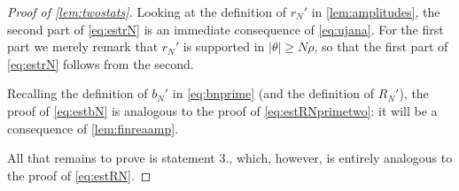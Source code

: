 \documentclass[
	fontsize=11pt, 
	twoside=false, 
	abstract=true, 
	a4paper,
]{scrartcl}
\newcommand{\dd}{\mathrm{d}}
\newcommand{\abs}[1]{\left\lvert#1\right\rvert}
\begin{document}
\begin{proof}[Proof of \cref{lem:twostats}]
		Looking at the definition of $r_N'$ in \cref{lem:amplitudes}, the second part of \cref{eq:estrN} is an immediate consequence of \cref{eq:ujana}. For the first part we merely remark that $r_N'$ is supported in $\abs{\theta} \geq N\rho$, so that the first part of \cref{eq:estrN} follows from the second.
		
		Recalling the definition of $b_N'$ in \cref{eq:bnprime} (and the definition of $R_N'$), the proof of \cref{eq:estbN} is analogous to the proof of \cref{eq:estRNprimetwo}: it will be a consequence of \cref{lem:finreaamp}.

		All that remains to prove is statement 3., which, however, is entirely analogous to the proof of \cref{eq:estRN}.
%	
%

\end{proof}
\end{document}
